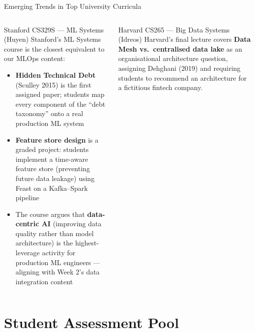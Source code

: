 \documentclass[aspectratio=169,10pt]{beamer}
\begin{document}
\begin{frame}{Emerging Trends in Top University Curricula}
\begin{columns}[T]
      \begin{alertblock}{Stanford CS329S — ML Systems (Huyen)}
        \small Stanford's ML Systems course is the closest equivalent to our MLOps content:
        \begin{itemize}
          \item \textbf{Hidden Technical Debt} (Sculley 2015) is the first assigned paper; students map every component of the ``debt taxonomy'' onto a real production ML system
          \item \textbf{Feature store design} is a graded project: students implement a time-aware feature store (preventing future data leakage) using Feast on a Kafka--Spark pipeline
          \item The course argues that \textbf{data-centric AI} (improving data quality rather than model architecture) is the highest-leverage activity for production ML engineers --- aligning with Week 2's data integration content
        \end{itemize}
      \end{alertblock}
      \begin{block}{Harvard CS265 — Big Data Systems (Idreos)}
        \small Harvard's final lecture covers \textbf{Data Mesh vs.\ centralised data lake} as an organisational architecture question, assigning Dehghani (2019) and requiring students to recommend an architecture for a fictitious fintech company.
      \end{block}
  \end{columns}
\end{frame}

\section{Student Assessment Pool}
\end{document}
